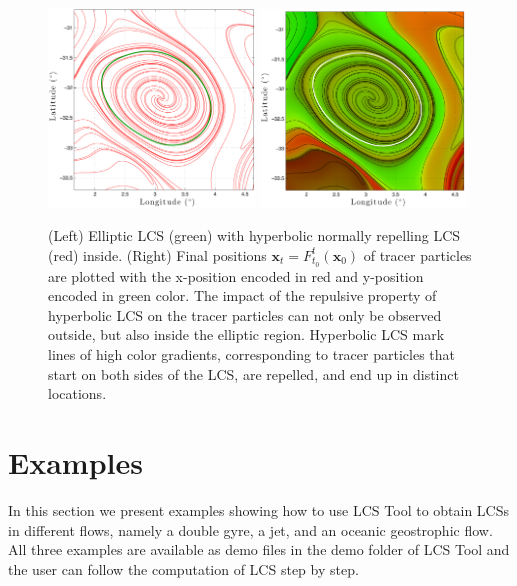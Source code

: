 \documentclass{article}
\begin{document}
\begin{figure}[hbt]
\centering
\includegraphics[width=0.49\textwidth]{graphics/ocean_dataset/LCS_fwd_coherent_eddy}
\includegraphics[width=0.49\textwidth]{graphics/ocean_dataset/LCS_fwd_colortracer}
\caption{(Left) Elliptic LCS (green) with hyperbolic normally repelling LCS (red) inside. (Right) Final positions $\boldsymbol x_t = F_{t_0}^t(\boldsymbol x_0)$ of tracer particles are plotted with the x-position encoded in red and y-position encoded in green color. The impact of the repulsive property of hyperbolic LCS on the tracer particles can not only be observed outside, but also inside the elliptic region. Hyperbolic LCS mark lines of high color gradients, corresponding to tracer particles that start on both sides of the LCS, are repelled, and end up in distinct locations.}
\label{fig:ocean_dataset_colortracer}
\end{figure}

\clearpage

\section{Examples}
In this section we present examples showing how to use LCS Tool to obtain LCSs in different flows, namely a double gyre, a jet, and an oceanic geostrophic flow. All three examples are available as demo files in the demo folder of LCS Tool and the user can follow the computation of LCS step by step.
\end{document}
